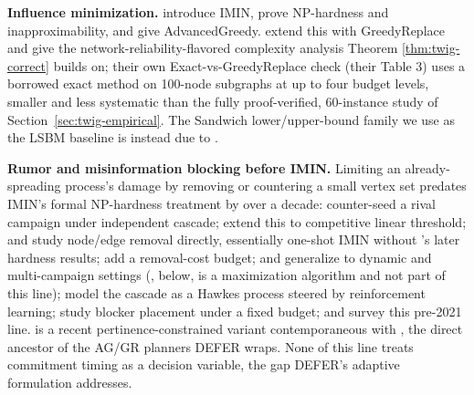 \documentclass[ASNA,number]{USG}
\begin{document}
\textbf{Influence minimization.} \citet{xie2023} introduce IMIN, prove
NP-hardness and inapproximability, and give AdvancedGreedy. \citet{xie2024}
extend this with GreedyReplace and give the network-reliability-flavored
complexity analysis Theorem \ref{thm:twig-correct} builds on; their own
Exact-vs-GreedyReplace check (their Table 3) uses a borrowed exact method
on 100-node subgraphs at up to four budget levels, smaller and less
systematic than the fully proof-verified, 60-instance study of
Section~\ref{sec:twig-empirical}. The Sandwich lower/upper-bound family we
use as the LSBM baseline is instead due to \citet{wang2024sandwich}.

\textbf{Rumor and misinformation blocking before IMIN.} Limiting an
already-spreading process's damage by removing or countering a small
vertex set predates IMIN's formal NP-hardness treatment by over a decade:
\citet{budak2011} counter-seed a rival campaign under independent
cascade; \citet{he2012} extend this to competitive linear threshold;
\citet{nguyen2012} and \citet{wang2013blocking} study node/edge removal
directly, essentially one-shot IMIN without \citet{xie2023}'s later
hardness results; \citet{fan2013} add a removal-cost budget;
\citet{wang2016drimux} and \citet{tong2018} generalize to dynamic and
multi-campaign settings (\citet{tong2017}, below, is a maximization
algorithm and not part of this line); \citet{farajtabar2017} model the
cascade as a Hawkes process steered by reinforcement learning;
\citet{yan2020} study blocker placement under a fixed budget; and
\citet{zareie2021} survey this pre-2021 line. \citet{xiang2024} is a
recent pertinence-constrained variant contemporaneous with
\citet{xie2024}, the direct ancestor of the AG/GR planners DEFER wraps.
None of this line treats commitment timing as a decision variable, the
gap DEFER's adaptive formulation addresses.
\end{document}

